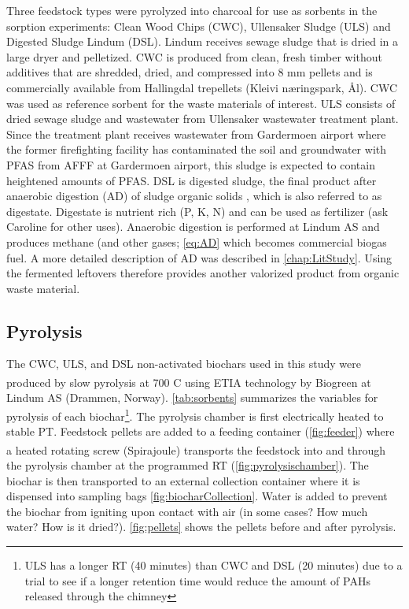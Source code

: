 Three feedstock types were pyrolyzed into charcoal for use as sorbents in the sorption experiments: Clean Wood Chips (CWC), Ullensaker Sludge (ULS) and Digested Sludge Lindum (DSL). Lindum receives sewage sludge that is dried in a large dryer and pelletized. CWC is produced from clean, fresh timber without additives that are shredded, dried, and compressed into 8 mm pellets and is commercially available from Hallingdal trepellets (Kleivi næringspark, Ål). CWC was used as reference sorbent for the waste materials of interest. ULS consists of dried sewage sludge and wastewater from Ullensaker wastewater treatment plant. Since the treatment plant receives wastewater from Gardermoen airport where the former firefighting facility has contaminated the soil and groundwater with PFAS from AFFF at Gardermoen airport, this sludge is expected to contain heightened amounts of PFAS. DSL is digested sludge, the final product after anaerobic digestion (AD) of sludge organic solids \citep{Alhashimi2017}, which is also referred to as digestate. Digestate is nutrient rich (P, K, N) and can be used as fertilizer (ask Caroline for other uses). Anaerobic digestion is performed at Lindum AS and produces methane (and other gases; \cref{eq:AD} which becomes commercial biogas fuel. A more detailed description of AD was described in \cref{chap:LitStudy}. Using the fermented leftovers therefore provides another valorized product from organic waste material. 

\subsection{Pyrolysis}
The CWC, ULS, and DSL non-activated biochars used in this study were produced by slow pyrolysis at 700 \textdegree C using ETIA technology by Biogreen\textsuperscript{\textcopyright} at Lindum AS (Drammen, Norway). \cref{tab:sorbents} summarizes the variables for pyrolysis of each biochar\footnote{ULS has a longer RT (40 minutes) than CWC and DSL (20 minutes) due to a trial to see if a longer retention time would reduce the amount of PAHs released through the chimney}. The pyrolysis chamber is first electrically heated to stable PT. Feedstock pellets are added to a feeding container (\cref{fig:feeder}) where a heated rotating screw (Spirajoule\textsuperscript{\textregistered}) transports the feedstock into and through the pyrolysis chamber at the programmed RT (\cref{fig:pyrolysischamber}). The biochar is then transported to an external collection container where it is dispensed into sampling bags \cref{fig:biocharCollection}. Water is added to prevent the biochar from igniting upon contact with air (in some cases? How much water? How is it dried?). \cref{fig:pellets} shows the pellets before and after pyrolysis. 

